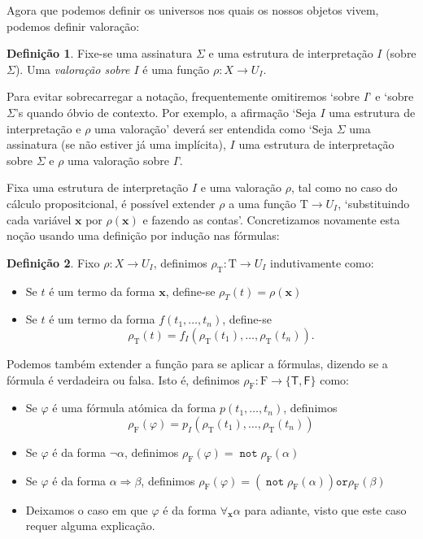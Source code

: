 \documentclass{report}
\theoremstyle{definition}
\newtheorem{definicao}{Definição}
\theoremstyle{remark}
\renewcommand{\bf}[1]{\mathbf{#1}}
\newcommand{\F}{\mathrm{F}}
\newcommand{\T}{\mathrm{T}}
\newcommand{\lt}{\mathsf{T}}
\newcommand{\lf}{\mathsf{F}}
\DeclareMathOperator{\pnot}{\texttt{not}}
\newcommand{\por}{\mathbin{\texttt{or}}}
\newcommand{\imply}{\mathbin{\Rightarrow}}
\begin{document}
	Agora que podemos definir os universos nos quais os nossos objetos vivem, podemos definir valoração:
	
	\begin{definicao}
	Fixe-se uma assinatura $\Sigma$ e uma estrutura de interpretação $I$ (sobre $\Sigma$). Uma \emph{valoração sobre $I$} é uma função $\rho : X \to U_I$.
	\end{definicao}
	
	Para evitar sobrecarregar a notação, frequentemente omitiremos `sobre $I$' e `sobre $\Sigma$'s quando óbvio de contexto. Por exemplo, a afirmação `Seja $I$ uma estrutura de interpretação e $\rho$ uma valoração' deverá ser entendida como `Seja $\Sigma$ uma assinatura (se não estiver já uma implícita), $I$ uma estrutura de interpretação sobre $\Sigma$ e $\rho$ uma valoração sobre $I$'.
	
	Fixa uma estrutura de interpretação $I$ e uma valoração $\rho$, tal como no caso do cálculo propositcional, é possível extender $\rho$ a uma função $\T \to U_I$, `substituindo cada variável $\bf x$ por $\rho(\bf x)$ e fazendo as contas'. Concretizamos novamente esta noção usando uma definição por indução nas fórmulas:
	
	\begin{definicao}
	Fixo $\rho : X \to U_I$, definimos $\rho_\T : \T \to U_I$ indutivamente como:
	
	\begin{itemize}
	\item Se $t$ é um termo da forma $\bf x$, define-se $\rho_T(t) = \rho(\bf x)$
	
	\item Se $t$ é um termo da forma $f(t_1, \dots, t_n)$, define-se
	\[\rho_\T(t) = f_I(\rho_\T(t_1), \dots, \rho_\T(t_n)).\]
	\end{itemize}
	
	Podemos também extender a função para se aplicar a fórmulas, dizendo se a fórmula é verdadeira ou falsa. Isto é, definimos $\rho_\F : \F \to \{\lt, \lf\}$ como:
	
	\begin{itemize}
	\item Se $\varphi$ é uma fórmula atómica da forma $p(t_1, \dots, t_n)$, definimos
	\[\rho_\F(\varphi) = p_I(\rho_\T(t_1), \dots, \rho_\T(t_n))\]
	
	\item Se $\varphi$ é da forma $\neg \alpha$, definimos $\rho_\F(\varphi) = \pnot \rho_\F(\alpha)$
	
	\item Se $\varphi$ é da forma $\alpha \imply \beta$, definimos $\rho_\F(\varphi) = (\pnot \rho_\F(\alpha)) \por \rho_\F(\beta)$
	
	\item Deixamos o caso em que $\varphi$ é da forma $\forall_{\bf x} \alpha$ para adiante, visto que este caso requer alguma explicação.
	\end{itemize}
	\end{definicao}
	
\end{document}
